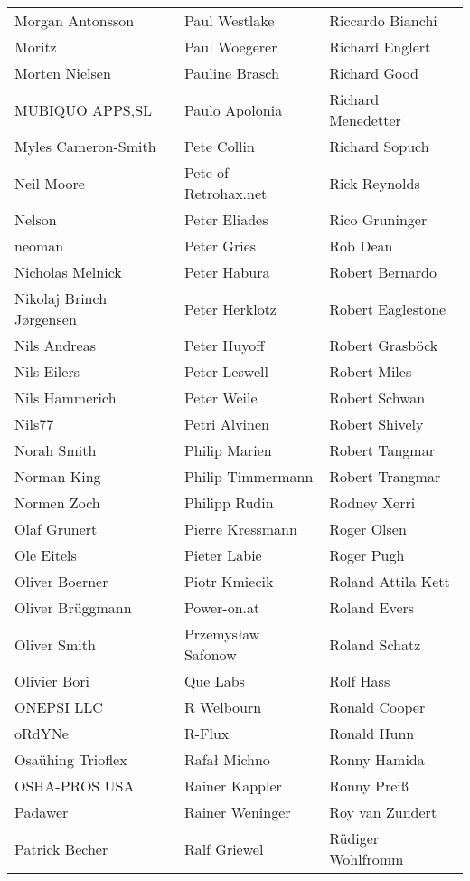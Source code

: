 \begin{tabular}{p{4.5cm}p{4.5cm}p{4.5cm}}
Morgan Antonsson & Paul Westlake & Riccardo Bianchi \\
Moritz & Paul Woegerer & Richard Englert \\
Morten Nielsen & Pauline Brasch & Richard Good \\
MUBIQUO APPS,SL & Paulo Apolonia & Richard Menedetter \\
Myles Cameron-Smith & Pete Collin & Richard Sopuch \\
Neil Moore & Pete of Retrohax.net & Rick Reynolds \\
Nelson & Peter Eliades & Rico Gruninger \\
neoman & Peter Gries & Rob Dean \\
Nicholas Melnick & Peter Habura & Robert Bernardo \\
Nikolaj Brinch Jørgensen & Peter Herklotz & Robert Eaglestone \\
Nils Andreas & Peter Huyoff & Robert Grasböck \\
Nils Eilers & Peter Leswell & Robert Miles \\
Nils Hammerich & Peter Weile & Robert Schwan \\
Nils77 & Petri Alvinen & Robert Shively \\
Norah Smith & Philip Marien & Robert Tangmar \\
Norman King & Philip Timmermann & Robert Trangmar \\
Normen Zoch & Philipp Rudin & Rodney Xerri \\
Olaf Grunert & Pierre Kressmann & Roger Olsen \\
Ole Eitels & Pieter Labie & Roger Pugh \\
Oliver Boerner & Piotr Kmiecik & Roland Attila Kett \\
Oliver Brüggmann & Power-on.at & Roland Evers \\
Oliver Smith & Przemysław Safonow & Roland Schatz \\
Olivier Bori & Que Labs & Rolf Hass \\
ONEPSI LLC & R Welbourn & Ronald Cooper \\
oRdYNe & R-Flux & Ronald Hunn \\
Osaühing Trioflex & Rafał Michno & Ronny Hamida \\
OSHA-PROS USA & Rainer Kappler & Ronny Preiß \\
Padawer & Rainer Weninger & Roy van Zundert \\
Patrick Becher & Ralf Griewel & Rüdiger Wohlfromm \\

\end{tabular}
